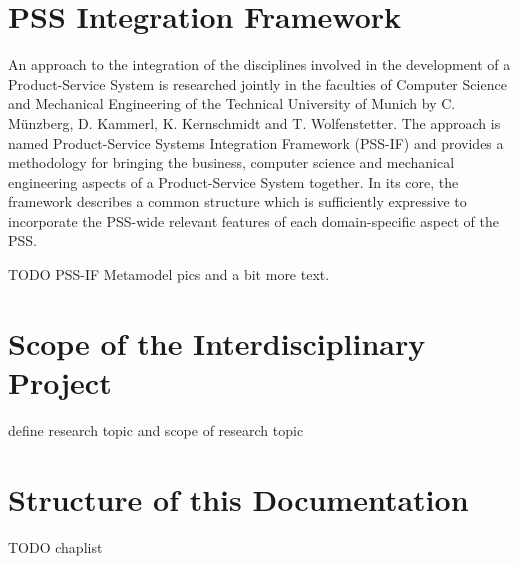 \section*{PSS Integration Framework}

An approach to the integration of the disciplines involved in the development of a Product-Service System is researched jointly in the faculties of Computer Science and Mechanical Engineering of the Technical University of Munich by C. M\"unzberg, D. Kammerl, K. Kernschmidt and T. Wolfenstetter. The approach is named Product-Service Systems Integration Framework (PSS-IF) and provides a methodology for bringing the business, computer science and mechanical engineering aspects of a Product-Service System together. In its core, the framework describes a common structure which is sufficiently expressive to incorporate the PSS-wide relevant features of each domain-specific aspect of the PSS.

\color{red}TODO PSS-IF Metamodel pics and a bit more text.\color{black}

\section*{Scope of the Interdisciplinary Project}

define research topic and scope of research topic

\section*{Structure of this Documentation}

TODO chaplist



